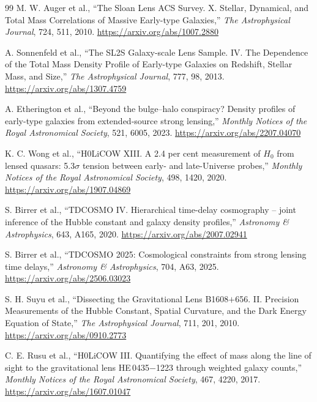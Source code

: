 \begin{thebibliography}{99}
M. W. Auger et al.,
``The Sloan Lens ACS Survey. X. Stellar, Dynamical, and Total Mass Correlations of Massive Early-type Galaxies,''
\emph{The Astrophysical Journal}, 724, 511, 2010.
\url{https://arxiv.org/abs/1007.2880}

A. Sonnenfeld et al.,
``The SL2S Galaxy-scale Lens Sample. IV. The Dependence of the Total Mass Density Profile of Early-type Galaxies on Redshift, Stellar Mass, and Size,''
\emph{The Astrophysical Journal}, 777, 98, 2013.
\url{https://arxiv.org/abs/1307.4759}

A. Etherington et al.,
``Beyond the bulge--halo conspiracy? Density profiles of early-type galaxies from extended-source strong lensing,''
\emph{Monthly Notices of the Royal Astronomical Society}, 521, 6005, 2023.
\url{https://arxiv.org/abs/2207.04070}

K. C. Wong et al.,
``H0LiCOW XIII. A 2.4 per cent measurement of $H_0$ from lensed quasars: 5.3$\sigma$ tension between early- and late-Universe probes,''
\emph{Monthly Notices of the Royal Astronomical Society}, 498, 1420, 2020.
\url{https://arxiv.org/abs/1907.04869}

S. Birrer et al.,
``TDCOSMO IV. Hierarchical time-delay cosmography -- joint inference of the Hubble constant and galaxy density profiles,''
\emph{Astronomy \& Astrophysics}, 643, A165, 2020.
\url{https://arxiv.org/abs/2007.02941}

S. Birrer et al.,
``TDCOSMO 2025: Cosmological constraints from strong lensing time delays,''
\emph{Astronomy \& Astrophysics}, 704, A63, 2025.
\url{https://arxiv.org/abs/2506.03023}

S. H. Suyu et al.,
``Dissecting the Gravitational Lens B1608$+$656. II. Precision Measurements of the Hubble Constant, Spatial Curvature, and the Dark Energy Equation of State,''
\emph{The Astrophysical Journal}, 711, 201, 2010.
\url{https://arxiv.org/abs/0910.2773}

C. E. Rusu et al.,
``H0LiCOW III. Quantifying the effect of mass along the line of sight to the gravitational lens HE\,0435$-$1223 through weighted galaxy counts,''
\emph{Monthly Notices of the Royal Astronomical Society}, 467, 4220, 2017.
\url{https://arxiv.org/abs/1607.01047}


\end{thebibliography}
